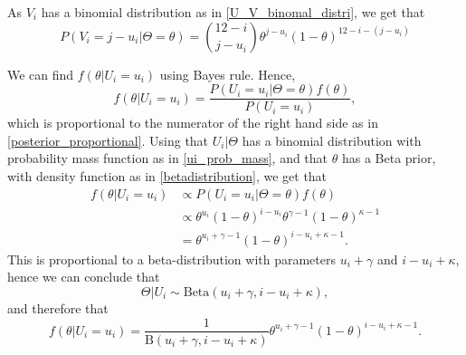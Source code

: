 As $V_i$ has a binomial distribution as in \eqref{U_V_binomal_distri}, we get that
\begin{equation}
\label{vi_equal_j_minus_ui}
    P(V_i=j-u_i|\Theta=\theta)=\binom{12-i}{j-u_i}\theta^{j-u_i}(1-\theta)^{12-i-(j-u_i)}
\end{equation}


We can find $f(\theta| U_i=u_i)$ using Bayes rule. Hence,
\begin{equation*}
    f(\theta| U_i=u_i) = \frac{P(U_i=u_i|\Theta=\theta)f(\theta)}{P(U_i=u_i)},
\end{equation*}
which is proportional to the numerator of the right hand side as in \eqref{posterior_proportional}. Using that $U_i|\Theta$ has a binomial distribution with probability mass function as in \eqref{ui_prob_mass}, and that $\theta$ has a Beta prior, with density function as in \eqref{betadistribution}, we get that
\begin{equation*}
    \begin{aligned}
        f(\theta|U_i=u_i) 
        &\propto P(U_i=u_i|\Theta=\theta)f(\theta)\\[6pt] 
        &\propto \theta^{u_i}(1-\theta)^{i-u_i}\theta^{\gamma-1}(1-\theta)^{\kappa-1}\\[6pt]
        &= \theta^{u_i+\gamma-1}(1-\theta)^{i-u_i+\kappa-1}.
    \end{aligned}
\end{equation*}
This is proportional to a beta-distribution with parameters $u_i+\gamma$ and $i-u_i+\kappa$, hence we can conclude that
\begin{equation*}
    \Theta|U_i \sim \text{Beta}(u_i+\gamma,i-u_i+\kappa),
\end{equation*}
and therefore that 
\begin{equation}
\label{theta_given_ui}
    f(\theta|U_i=u_i) = \frac{1}{\text{B}(u_i+\gamma,i-u_i+\kappa)}\theta^{u_i+\gamma-1}(1-\theta)^{i-u_i+\kappa-1}.
\end{equation}

